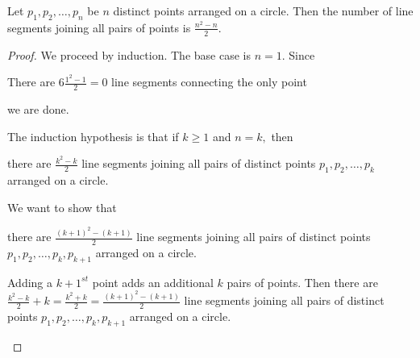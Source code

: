 \documentclass[handout]{ximera}
\begin{document}
\begin{br}
    Let $p_{1}, p_{2}, \ldots, p_{n}$ be $n$ distinct points arranged on a circle.  Then the number of line segments joining all pairs of points is $\frac{n^{2}-n}{2}$.

    \begin{proof}
        We proceed by induction. The base case is $n=1$. Since 
        \begin{shortAnswer}[\hrulefill]
            There are $6\frac{1^{2}-1}{2}=0$ line segments connecting the only point
        \end{shortAnswer}
        we are done.

        The induction hypothesis is that if $k \geq 1$ and $n = k,$ then 
        \begin{shortAnswer}
            there are $\frac{k^{2}-k}{2}$ line segments joining all pairs of distinct points $p_{1}, p_{2}, \ldots, p_{k}$ arranged on a circle.
        \end{shortAnswer}

        We want to show that
        \begin{shortAnswer}
            there are $\frac{(k+1)^{2}-(k+1)}{2}$ line segments joining all pairs of distinct points $p_{1}, p_{2}, \ldots, p_{k}, p_{k+1}$ arranged on a circle.
        \end{shortAnswer}

        \begin{shortAnswer}
            Adding a $k+1^{st}$ point adds an additional $k$ pairs of points. Then there are $\frac{k^{2}-k}{2}+k=\frac{k^{2}+k}{2}=\frac{(k+1)^2-(k+1)}{2}$ line segments joining all pairs of distinct points $p_{1}, p_{2}, \ldots, p_{k}, p_{k+1}$ arranged on a circle.
        \end{shortAnswer}
    \end{proof}
\end{br}

\pdfOnly{
    \ifhandout{
        \pagebreak}
        \else
        \fi}
\end{document}
